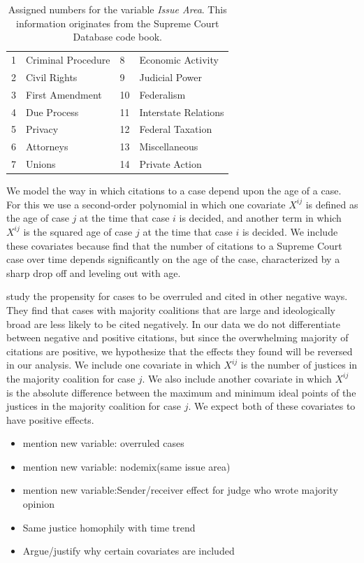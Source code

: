 \documentclass[headsepline=true, abstracton]{scrartcl}
\begin{document}
\begin{table}[]
\centering
\begin{tabular}{llll}
1 & Criminal Procedure & 8  & Economic Activity    \\
2 & Civil Rights       & 9  & Judicial Power       \\
3 & First Amendment    & 10 & Federalism           \\
4 & Due Process        & 11 & Interstate Relations \\
5 & Privacy            & 12 & Federal Taxation     \\
6 & Attorneys          & 13 & Miscellaneous        \\
7 & Unions             & 14 & Private Action      
\end{tabular}
\caption{Assigned numbers for the variable \textit{Issue Area}. This information originates from the Supreme Court Database code book.}
\label{issue_area_coding}
\end{table}

We model the way in which citations to a case depend upon the age of a case. For this we use a second-order polynomial in which one covariate $X^{ij}$ is defined as the age of case $j$ at the time that case $i$ is decided, and another term in which $X^{ij}$ is the squared age of case $j$ at the time that case $i$ is decided. We include these covariates because \citet{black2013citation} find that the number of citations to a Supreme Court case over time depends significantly on the age of the case, characterized by a sharp drop off and leveling out with age. 

\citet{benjamin2012standing} study the propensity for cases to be overruled and cited in other negative ways. They find that cases with majority coalitions that are large and ideologically broad are less likely to be cited negatively. In our data we do not differentiate between negative and positive citations, but since the overwhelming majority of citations are positive, we hypothesize that the effects they found will be reversed in our analysis. We include one covariate in which $X^{ij}$ is the number of justices in the majority coalition for case $j$. We also include another covariate in which $X^{ij}$ is the absolute difference between the maximum and minimum ideal points of the justices in the majority coalition for case $j$. We expect both of these covariates to have positive effects.

\begin{itemize}
\item mention new variable: overruled cases
\item mention new variable: nodemix(same issue area)
\item mention new variable:Sender/receiver effect for judge who wrote majority opinion
\item Same justice homophily with time trend
\item Argue/justify why certain covariates are included
\end{itemize}
\end{document}
